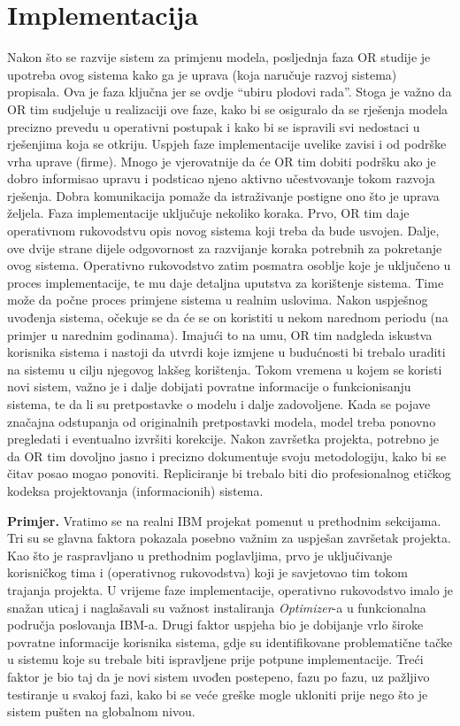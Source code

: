 \documentclass[a4paper, utf8, 11pt, colorlinks]{book}
\begin{document}
\section{Implementacija}
Nakon što se razvije sistem za primjenu modela, posljednja faza OR studije je upotreba ovog sistema kako ga je uprava (koja naručuje razvoj sistema) propisala. Ova je faza ključna jer se ovdje ``ubiru plodovi rada''. Stoga je važno da OR tim  sudjeluje u  realizaciji ove faze, kako bi se osiguralo da se rješenja modela precizno prevedu u operativni postupak i kako bi se ispravili svi nedostaci u rješenjima koja se otkriju. Uspjeh faze implementacije uvelike zavisi i od podrške vrha uprave (firme). Mnogo je vjerovatnije da će OR tim dobiti podršku ako je dobro informisao upravu i podsticao  njeno aktivno učestvovanje tokom razvoja rješenja. Dobra komunikacija pomaže da istraživanje postigne ono što je uprava željela.  Faza implementacije uključuje nekoliko koraka. Prvo, OR tim daje operativnom rukovodstvu opis novog sistema koji treba da bude usvojen. Dalje, ove dvije strane dijele odgovornost za razvijanje koraka potrebnih za pokretanje ovog sistema. Operativno rukovodstvo zatim posmatra  osoblje koje je uključeno u proces implementacije, te mu daje detaljna uputstva za korištenje sistema. Time može da počne proces primjene sistema u realnim uslovima. Nakon uspješnog uvođenja sistema, očekuje se da će se on koristiti u nekom narednom periodu (na primjer u narednim godinama). Imajući to na umu, OR tim nadgleda iskustva korisnika sistema i nastoji da utvrdi koje izmjene u budućnosti bi trebalo uraditi na sistemu  u cilju njegovog lakšeg korištenja.  Tokom vremena u kojem se koristi novi sistem, važno je i dalje dobijati povratne informacije o funkcionisanju sistema, te da li su pretpostavke o modelu i dalje zadovoljene. Kada se pojave značajna odstupanja od originalnih pretpostavki modela, model treba ponovno pregledati i eventualno izvršiti korekcije. Nakon završetka projekta, potrebno je da OR tim  dovoljno jasno i precizno dokumentuje svoju metodologiju, kako bi se čitav posao mogao ponoviti. Repliciranje bi trebalo
biti dio profesionalnog etičkog kodeksa projektovanja (informacionih) sistema. %

\textbf{Primjer.} Vratimo se na realni  IBM projekat pomenut u prethodnim sekcijama.  Tri su se glavna faktora pokazala posebno važnim za uspješan završetak projekta. Kao što je raspravljano u prethodnim poglavljima, 
prvo je   uključivanje korisničkog tima i (operativnog rukovodstva) koji je savjetovao tim tokom trajanja   projekta. U vrijeme faze implementacije, operativno rukovodstvo imalo je snažan  uticaj i naglašavali su važnost instaliranja \emph{Optimizer}-a u  funkcionalna područja poslovanja IBM-a. Drugi faktor uspjeha bio je dobijanje vrlo široke povratne informacije korisnika sistema, gdje su identifikovane problematične tačke u sistemu koje su  trebale biti ispravljene prije potpune implementacije. 
Treći faktor je bio taj da je novi sistem  uvođen postepeno, fazu po fazu, uz pažljivo testiranje u svakoj fazi, kako bi se veće greške mogle ukloniti prije nego što je sistem   pušten na  globalnom nivou.  
\vspace{0.5cm}
\end{document}

